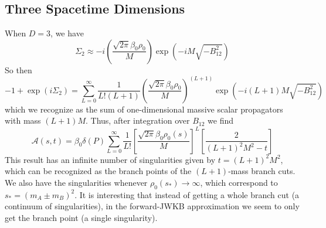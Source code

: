 \subsection{Three Spacetime Dimensions}
When $D = 3$, we have
\begin{equation}
	\Sigma_{2} \approx -i \left( \frac{\sqrt{2 \pi} \beta_{0} \rho_{0}}{M} \right) \exp{\left( -i M \sqrt{-B_{12}^{2}}\right)}
\end{equation}
So then
\begin{equation}
	{-1} + \exp{(i \Sigma_{2})} = \sum_{L = 0}^{\infty} \frac{1}{L! (L+1)} \left( \frac{\sqrt{2 \pi} \beta_{0} \rho_{0}}{M} \right)^{(L+1)} \exp{\left( -i (L+1) M \sqrt{-B_{12}^{2}}\right)}
\end{equation}
which we recognize as the sum of one-dimensional massive scalar propagators with mass $(L+1)M$. Thus, after integration over $B_{12}$ we find
\begin{equation}
	\mathcal{A}(s, t) = \beta_{0} \delta(P) \sum_{L = 0}^{\infty} \frac{1}{L!} \left[ \frac{\sqrt{2 \pi} \beta_{0} \rho_{0}(s)}{M} \right]^{L} \left[ \frac{2}{(L+1)^{2} M^{2} - t} \right] \label{3Avarphi}
\end{equation}
This result has an infinite number of singularities given by $t = (L+1)^{2}M^{2}$, which can be recognized as the branch points of the $(L+1)$-mass branch cuts. We also have the singularities whenever $\rho_{0}(s_{*}) \rightarrow \infty$, which correspond to $s_{*} = (m_{A} \pm m_{B})^{2}$. It is interesting that instead of getting a whole branch cut (a continuum of singularities), in the forward-JWKB approximation we seem to only get the branch point (a single singularity).

